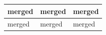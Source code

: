 \documentclass[11pt,a4paper]{article}
\begin{document}
\begin{table}[h]
\begin{tabular}{|l|l|l|}
\hline
merged & merged & merged \\ \hline
merged & merged & merged \\ \hline
\end{tabular}
\end{table}
\end{document}
